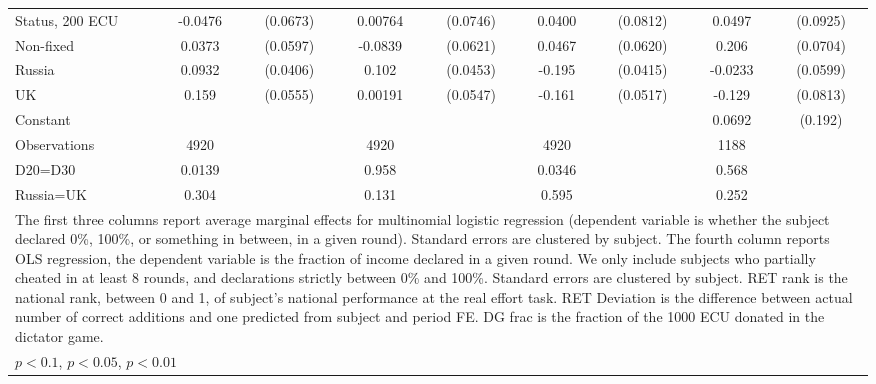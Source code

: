 \begin{tabular}{l|cccccc|cc}
Status, 200 ECU&  -0.0476         & (0.0673)&  0.00764         & (0.0746)&   0.0400         & (0.0812)&   0.0497         & (0.0925)\\
Non-fixed     &   0.0373         & (0.0597)&  -0.0839         & (0.0621)&   0.0467         & (0.0620)&    0.206\sym{***}& (0.0704)\\
Russia        &   0.0932\sym{**} & (0.0406)&    0.102\sym{**} & (0.0453)&   -0.195\sym{***}& (0.0415)&  -0.0233         & (0.0599)\\
UK            &    0.159\sym{***}& (0.0555)&  0.00191         & (0.0547)&   -0.161\sym{***}& (0.0517)&   -0.129         & (0.0813)\\
Constant        &                  &         &                  &         &                  &         &   0.0692         &  (0.192)\\
\hline
Observations    &     4920         &         &     4920         &         &     4920         &         &     1188         &         \\
D20=D30         &   0.0139         &         &    0.958         &         &   0.0346         &         &    0.568         &         \\
Russia=UK       &    0.304         &         &    0.131         &         &    0.595         &         &    0.252         &         \\
\hline\hline
\multicolumn{9}{p{16cm}}{\tiny The first three columns report average marginal effects for multinomial logistic regression (dependent variable is whether the subject declared 0\%, 100\%, or something in between, in a given round). Standard errors are clustered by subject. The fourth column reports OLS regression, the dependent variable is the fraction of income declared in a given round. We only include subjects who partially cheated in at least 8 rounds, and declarations strictly between 0\% and 100\%. Standard errors are clustered by subject. RET rank is the national rank, between 0 and 1, of subject's national performance at the real effort task. RET Deviation is the difference between actual number of correct additions and one predicted from subject and period FE. DG frac is the fraction of the 1000 ECU donated in the dictator game.}\\
\multicolumn{9}{l}{\tiny \sym{*} \(p<0.1\), \sym{**} \(p<0.05\), \sym{***} \(p<0.01\)}\\
\end{tabular}